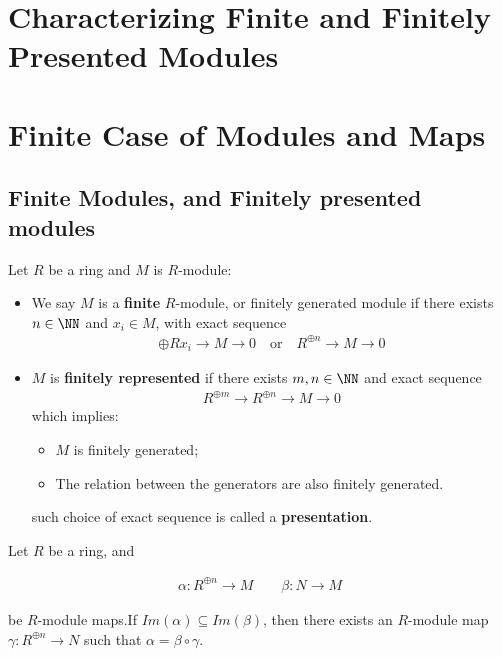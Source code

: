 \documentclass[Total.tex]{subfiles}
\begin{document}
		\section{Characterizing Finite and Finitely Presented Modules}
			
		\section{Finite Case of Modules and Maps}
			\subsection{Finite Modules, and Finitely presented modules}
		
			\begin{Def}
				Let $R$ be a ring and $M$ is $R$-module:
				
				\begin{itemize}
					\item We say $M$ is a \textbf{finite} $R$-module, or finitely generated module if there exists $n\in \NN$ and $x_i\in M$, with exact sequence
					\begin{gather*}
						\oplus Rx_i\rightarrow M \rightarrow 0\quad\mbox{or}\quad R^{\oplus n}\rightarrow M\rightarrow 0
					\end{gather*}
					\item $M$ is \textbf{finitely represented} if there exists $m,n\in \NN$ and exact sequence
					\begin{gather*}
						R^{\oplus m}\rightarrow R^{\oplus n}\rightarrow M\rightarrow 0
					\end{gather*}
					which implies:
					\begin{itemize}
						\item $M$ is finitely generated;
						\item The relation between the generators are also finitely generated.
					\end{itemize}
					such choice of exact sequence is called a \textbf{presentation}.
 				\end{itemize}
			\end{Def}
			
			\begin{lemma}
				Let $R$ be a ring, and 
				
				\begin{gather*}
					\alpha:R^{\oplus n}\rightarrow M\qquad \beta:N\rightarrow M
				\end{gather*}
				
				be $R$-module maps.If $Im(\alpha)\subseteq Im(\beta)$, then there exists an $R$-module map $\gamma:R^{\oplus n}\rightarrow N$ such that $\alpha=\beta\circ\gamma$.
				
				\begin{center}
				\end{center}
			\end{lemma}
			
\end{document}
